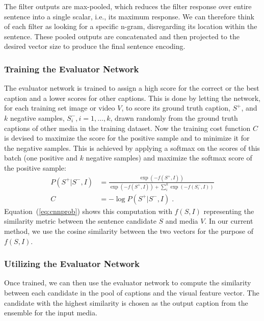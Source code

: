 The filter outputs are max-pooled, which reduces the filter response over entire
sentence into a single scalar, i.e., its maximum response. 
We can therefore think of each filter as looking for a specific n-gram,
disregarding its location within the sentence.
These pooled outputs are concatenated and then projected to the desired vector
size to produce the final sentence encoding.


\subsubsection{Training the Evaluator Network}

The evaluator network is trained to assign a high score for the correct or the
best caption and a lower scores for other captions.
This is done by letting the network, for each training set image or video $V$,
to score its ground truth caption, $S^+$, and $k$ negative samples, $S_i^-,
i=1,\ldots,k$, drawn randomly from the ground truth captions of other media in
the training dataset.
Now the training cost function $C$ is devised to maximize the score for the
positive sample and to minimize it for the negative samples. 
This is achieved by applying a softmax on the scores of this batch (one positive
and $k$ negative samples) and maximize the softmax score
of the positive sample:
\begin{align}
  \label{eq:cnnprob} 
  P(S^+|S^-,I) &= \frac{\exp(-f(S^+,I))}{\exp(-f(S^+,I)) +
           \sum\limits_i^k{\exp(-f(S_i^- ,I))}} \\
  C &= -\log P(S^+|S^-,I) \;.
\end{align}
Equation~(\ref{eq:cnnprob}) shows this computation with $f(S,I)$ representing
the similarity metric between the sentence candidate $S$ and media $V$.
In our current method, we use the cosine similarity between the two vectors for
the purpose of $f(S,I)$.


\subsubsection{Utilizing the Evaluator Network}

Once trained, we can then use the evaluator network to compute the similarity
between each candidate in the pool of captions and the visual feature vector. 
The candidate with the highest similarity is chosen as the output caption from
the ensemble for the input media.

